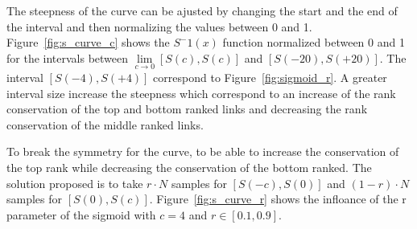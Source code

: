 The steepness of the curve can be ajusted by changing the start and the end of the interval and then normalizing the values between 0 and 1.
Figure~\ref{fig:s_curve_c} shows the $S^-1(x)$ function normalized between 0 and 1 for the intervals between $\lim\limits_{c \rightarrow 0} \left[S(c), S(c)\right]$ and $\left[S(-20), S(+20)\right]$.
The interval $\left[S(-4), S(+4)\right]$ correspond to Figure~\ref{fig:sigmoid_r}.
A greater interval size increase the steepness which correspond to an increase of the rank conservation of the top and bottom ranked links and decreasing the rank conservation of the middle ranked links.

To break the symmetry for the curve, to be able to increase the conservation of the top rank while decreasing the conservation of the bottom ranked.
The solution proposed is to take $r \cdot N$ samples for $\left[S(-c), S(0)\right]$ and $(1-r) \cdot N$ samples for $\left[S(0), S(c)\right]$.
Figure~\ref{fig:s_curve_r} shows the infloance of the r parameter of the sigmoid with $c = 4$ and $r \in \left[0.1, 0.9\right]$.

